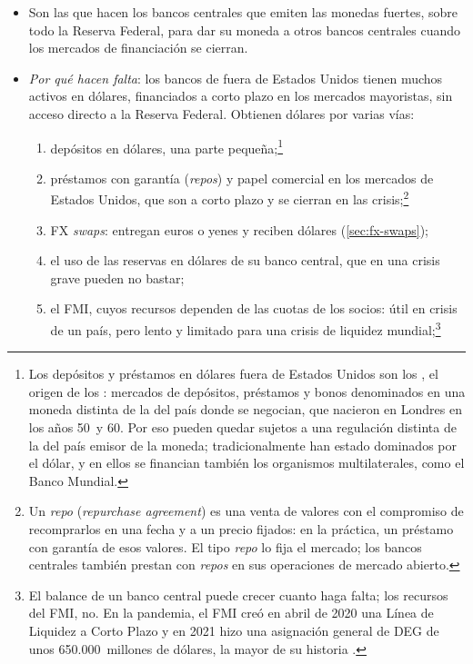 \documentclass[11pt]{article}
\begin{document}
\begin{itemize}
\item Son las que hacen los bancos centrales que emiten las monedas fuertes, sobre todo la Reserva Federal, para dar su moneda a otros bancos centrales cuando los mercados de financiación se cierran.
\item \emph{Por qué hacen falta}: los bancos de fuera de Estados Unidos tienen muchos activos en dólares, financiados a corto plazo en los mercados mayoristas, sin acceso directo a la Reserva Federal. Obtienen dólares por varias vías:
  \begin{enumerate}
  \item depósitos en dólares, una parte pequeña;\footnote{Los depósitos y préstamos en dólares fuera de Estados Unidos son los , el origen de los : mercados de depósitos, préstamos y bonos denominados en una moneda distinta de la del país donde se negocian, que nacieron en Londres en los años 50~y 60. Por eso pueden quedar sujetos a una regulación distinta de la del país emisor de la moneda; tradicionalmente han estado dominados por el dólar, y en ellos se financian también los organismos multilaterales, como el Banco Mundial\nocite{KrugmanObstfeldMelitz2022International}.}
  \item préstamos con garantía (\emph{repos}) y papel comercial en los mercados de Estados Unidos, que son a corto plazo y se cierran en las crisis;\footnote{Un \emph{repo} (\emph{repurchase agreement}) es una venta de valores con el compromiso de recomprarlos en una fecha y a un precio fijados: en la práctica, un préstamo con garantía de esos valores. El tipo \emph{repo} lo fija el mercado; los bancos centrales también prestan con \emph{repos} en sus operaciones de mercado abierto.}
  \item FX \emph{swaps}: entregan euros o yenes y reciben dólares (\ref{sec:fx-swaps});
  \item el uso de las reservas en dólares de su banco central, que en una crisis grave pueden no bastar;
  \item el FMI, cuyos recursos dependen de las cuotas de los socios: útil en crisis de un país, pero lento y limitado para una crisis de liquidez mundial;\footnote{El balance de un banco central puede crecer cuanto haga falta; los recursos del FMI, no. En la pandemia, el FMI creó en abril de 2020 una Línea de Liquidez a Corto Plazo\nocite{FMI2020SLL} y en 2021 hizo una asignación general de DEG de unos 650.000~millones de dólares, la mayor de su historia\nocite{FMI2023DEGFicha} .}

\end{enumerate}
\end{itemize}
\end{document}
